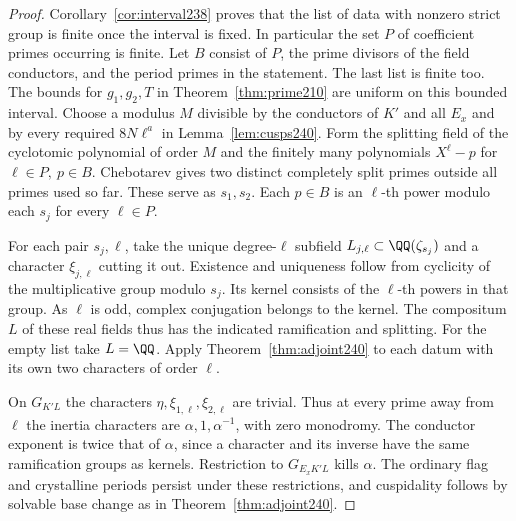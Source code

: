 \documentclass[a4paper,11pt]{article}
\theoremstyle{definition}
\theoremstyle{remark}
\numberwithin{equation}{section}
\begin{document}
\begin{proof}
Corollary~\ref{cor:interval238} proves that the list of data
with nonzero strict group is finite once the interval is fixed.
In particular the set \(P\) of coefficient primes occurring is
finite. Let \(B\) consist of \(P\), the prime divisors of the
field conductors, and the period primes in the statement.
The last list is finite too. The bounds for \(g_1,g_2,T\)
in Theorem~\ref{thm:prime210} are uniform on this bounded
interval. Choose a modulus \(M\) divisible by the conductors
of \(K'\) and all \(E_x\) and by every required \(8N\ell^a\)
in Lemma~\ref{lem:cusps240}. Form the splitting field of
the cyclotomic polynomial of order \(M\) and the finitely many
polynomials \(X^\ell-p\) for \(\ell\in P,\ p\in B\).
Chebotarev gives two distinct completely split primes outside
all primes used so far. These serve as \(s_1,s_2\).
Each \(p\in B\) is an \(\ell\)-th power modulo each \(s_j\)
for every \(\ell\in P\).

For each pair \(s_j,\ell\), take the unique degree-\(\ell\)
subfield \(L_{j,\ell}\subset\QQ(\zeta_{s_j})\) and a character
\(\xi_{j,\ell}\) cutting it out. Existence and uniqueness follow
from cyclicity of the multiplicative group modulo \(s_j\).
Its kernel consists of the \(\ell\)-th powers in that group.
As \(\ell\) is odd, complex conjugation belongs to the kernel.
The compositum \(L\) of these real fields thus has the indicated
ramification and splitting. For the empty list take \(L=\QQ\).
Apply Theorem~\ref{thm:adjoint240} to each datum with its own
two characters of order \(\ell\).

On \(G_{K'L}\) the characters \(\eta,\xi_{1,\ell},\xi_{2,\ell}\)
are trivial. Thus at every prime away from \(\ell\) the inertia
characters are \(\alpha,1,\alpha^{-1}\), with zero monodromy.
The conductor exponent is twice that of \(\alpha\), since a
character and its inverse have the same ramification groups
as kernels. Restriction to \(G_{E_xK'L}\) kills \(\alpha\).
The ordinary flag and crystalline periods persist under these
restrictions, and cuspidality follows by solvable base change as
in Theorem~\ref{thm:adjoint240}.
\end{proof}
\end{document}
